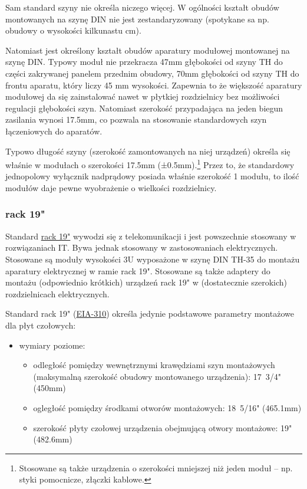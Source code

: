 Sam standard szyny nie określa niczego więcej.
W ogólności kształt obudów montowanych na szynę DIN nie jest zestandaryzowany (spotykane sa np. obudowy o wysokości kilkunastu cm).

Natomiast jest określony kształt obudów aparatury modułowej montowanej na szynę DIN.
Typowy moduł nie przekracza 47mm głębokości od szyny TH do części zakrywanej panelem przednim obudowy, 70mm głębokości od szyny TH do frontu aparatu, który liczy 45 mm wysokości.
Zapewnia to że większość aparatury modułowej da się zainstalować nawet w płytkiej rozdzielnicy bez możliwości regulacji głębokości szyn.
Natomiast szerokość przypadająca na jeden biegun zasilania wynosi 17.5mm, co pozwala na stosowanie standardowych szyn łączeniowych do aparatów.

Typowo długość szyny (szerokość zamontowanych na niej urządzeń) określa się właśnie w modułach o szerokości 17.5mm (±0.5mm).\footnote{Stosowane są także urządzenia o szerokości mniejszej niż jeden moduł – np. styki pomocnicze, złączki kablowe.}
Przez to, że standardowy jednopolowy wyłącznik nadprądowy posiada właśnie szerokość 1 modułu, to ilość modułów daje pewne wyobrażenie o wielkości rozdzielnicy.


\subsubsection{rack 19"}

Standard \href{https://en.wikipedia.org/wiki/19-inch_rack}{rack 19"} wywodzi się z telekomunikacji i jest powszechnie stosowany w rozwiązaniach IT.
Bywa jednak stosowany w zastosowaniach elektrycznych.
Stosowane są moduły wysokości 3U wyposażone w szynę DIN TH-35 do montażu aparatury elektrycznej w ramie rack 19".
Stosowane są także adaptery do montażu (odpowiednio krótkich) urządzeń rack 19" w (dostatecznie szerokich) rozdzielnicach elektrycznych.

Standard rack 19" (\href{https://www.server-racks.com/eia-310.html}{EIA-310}) określa jedynie podstawowe parametry montażowe dla płyt czołowych:
\begin{itemize}
	\item wymiary poziome:
	\begin{itemize}
		\item odległość pomiędzy wewnętrznymi krawędziami szyn montażowych (maksymalną szerokość obudowy montowanego urządzenia): 17~3/4" (450mm)
		\item ogległość pomiędzy środkami otworów montażowych: 18~5/16" (465.1mm)
		\item szerokość płyty czołowej urządzenia obejmującą otwory montażowe: 19" (482.6mm)
	\end{itemize}
\end{itemize}

